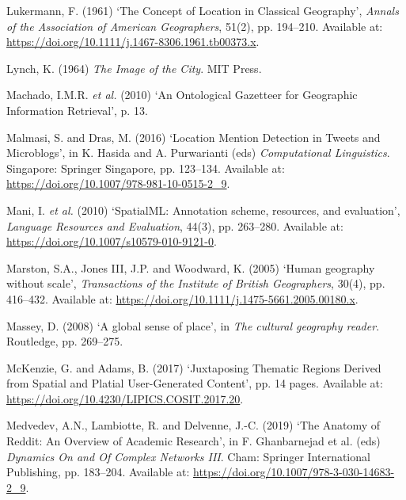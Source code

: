 \documentclass[
  letterpaper,
  11pt,
  english,
  onehalfspacing,
  headsepline]{MastersDoctoralThesis}
\newlength{\cslhangindent}
\newlength{\cslentryspacingunit} %
\newenvironment{CSLReferences}[2] %
 {%
  \setlength{\parindent}{0pt}
  \ifodd #1
  \let\oldpar\par
  \def\par{\hangindent=\cslhangindent\oldpar}
  \fi
  \setlength{\parskip}{#2\cslentryspacingunit}
 }%
 {}
\begin{document}
\begin{CSLReferences}{0}{0}
\leavevmode{}%
Lukermann, F. (1961) {`The {Concept} of {Location} in {Classical
Geography}'}, \emph{Annals of the Association of American Geographers},
51(2), pp. 194--210. Available at:
\url{https://doi.org/10.1111/j.1467-8306.1961.tb00373.x}.

\leavevmode{}%
Lynch, K. (1964) \emph{The {Image} of the {City}}. {MIT Press}.

\leavevmode{}%
Machado, I.M.R. \emph{et al.} (2010) {`An {Ontological Gazetteer} for
{Geographic Information Retrieval}'}, p. 13.

\leavevmode{}%
Malmasi, S. and Dras, M. (2016) {`Location {Mention Detection} in
{Tweets} and {Microblogs}'}, in K. Hasida and A. Purwarianti (eds)
\emph{Computational {Linguistics}}. {Singapore}: {Springer Singapore},
pp. 123--134. Available at:
\url{https://doi.org/10.1007/978-981-10-0515-2_9}.

\leavevmode{}%
Mani, I. \emph{et al.} (2010) {`{SpatialML}: Annotation scheme,
resources, and evaluation'}, \emph{Language Resources and Evaluation},
44(3), pp. 263--280. Available at:
\url{https://doi.org/10.1007/s10579-010-9121-0}.

\leavevmode{}%
Marston, S.A., Jones III, J.P. and Woodward, K. (2005) {`Human geography
without scale'}, \emph{Transactions of the Institute of British
Geographers}, 30(4), pp. 416--432. Available at:
\url{https://doi.org/10.1111/j.1475-5661.2005.00180.x}.

\leavevmode{}%
Massey, D. (2008) {`A global sense of place'}, in \emph{The cultural
geography reader}. {Routledge}, pp. 269--275.

\leavevmode{}%
McKenzie, G. and Adams, B. (2017) {`Juxtaposing {Thematic Regions
Derived} from {Spatial} and {Platial User-Generated Content}'}, pp. 14
pages. Available at: \url{https://doi.org/10.4230/LIPICS.COSIT.2017.20}.

\leavevmode{}%
Medvedev, A.N., Lambiotte, R. and Delvenne, J.-C. (2019) {`The {Anatomy}
of {Reddit}: {An Overview} of {Academic Research}'}, in F. Ghanbarnejad
et al. (eds) \emph{Dynamics {On} and {Of Complex Networks III}}. {Cham}:
{Springer International Publishing}, pp. 183--204. Available at:
\url{https://doi.org/10.1007/978-3-030-14683-2_9}.


\end{CSLReferences}
\end{document}
